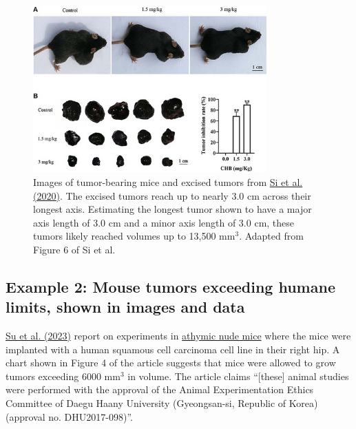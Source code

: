 \documentclass[letterpaper, 12pt]{article}
\begin{document}
\begin{figure}[h!tbp]
    \centering
    \includegraphics[width=0.8\textwidth]{img/tumor_burden/Screenshot 2025-04-04 at 15-23-31 fonc-10-00415-g006.png}
    \caption*{Images of tumor-bearing mice and excised tumors from \href{https://doi.org/10.3389/fonc.2020.00415}{Si et al. (2020)}. The excised tumors reach up to nearly 3.0 cm across their longest axis. Estimating the longest tumor shown to have a major axis length of 3.0 cm and a minor axis length of 3.0 cm, these tumors likely reached volumes up to 13,500 mm$^3$. Adapted from Figure 6 of Si et al.}
\end{figure}

\pagebreak

\subsection*{Example 2: Mouse tumors exceeding humane limits, shown in images and data}

\href{https://doi.org/10.3390/app13021090}{Su et al. (2023)} report on experiments in \href{https://www.jax.org/strain/007850}{athymic nude mice} where the mice were implanted with a human squamous cell carcinoma cell line in their right hip. A chart shown in Figure 4 of the article suggests that mice were allowed to grow tumors exceeding 6000 mm$^3$ in volume. The article claims ``[these] animal studies were performed with the approval of the Animal Experimentation Ethics Committee of Daegu Haany University (Gyeongsan-si, Republic of Korea) (approval no. DHU2017-098)''.
\end{document}
